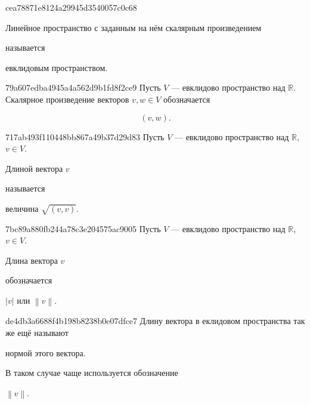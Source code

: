 \begin{note}{cea78871e8124a29945d3540057c0c68}
    \begin{icloze}{1}Линейное пространство с заданным на нём скалярным произведением\end{icloze} называется \begin{icloze}{2}евклидовым пространством.\end{icloze}
\end{note}

\begin{note}{79a607edba4945a4a562d9b1fd8f2ce9}
    Пусть \({ V }\) --- евклидово пространство над \({ \mathbb R }\).
    Скалярное произведение векторов \({ v, w \in V }\) обозначается
    \begin{icloze}{1}
        \[
            (v, w).
        \]
    \end{icloze}
\end{note}

\begin{note}{717ab493f110448bb867a49b37d29d83}
    Пусть \({ V }\) --- евклидово пространство над \({ \mathbb R }\),\: \({ v \in V }\).
    \begin{icloze}{2}Длиной вектора \({ v }\)\end{icloze} называется \begin{icloze}{1}величина \( \sqrt{(v, v)} \).\end{icloze}
\end{note}

\begin{note}{7bc89a880fb244a78c3e204575ac9005}
    Пусть \({ V }\) --- евклидово пространство над \({ \mathbb R }\),\: \({ v \in V }\).
    \begin{icloze}{2}Длина вектора \({ v }\)\end{icloze} обозначается \begin{icloze}{1}\( \left\lvert v \right\rvert \) или \({ \left\lVert v \right\rVert }\).\end{icloze}
\end{note}

\begin{note}{de4db3a6688f4b198b8238b0e07dfce7}
    Длину вектора в еклидовом пространства так же ещё называют \begin{icloze}{1}нормой этого вектора.\end{icloze} В таком случае чаще используется обозначение \begin{icloze}{2}\( \left\lVert v \right\rVert \).\end{icloze}
\end{note}

